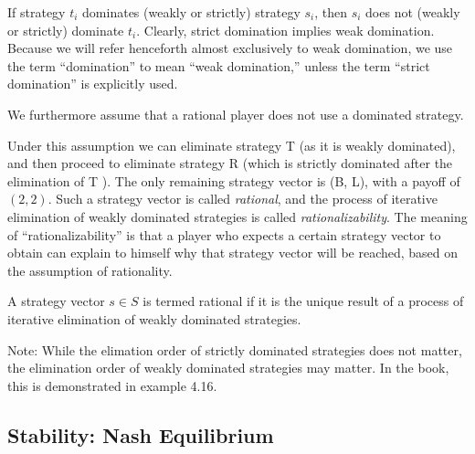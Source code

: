 If strategy $t_i$ dominates (weakly or strictly) strategy $s_i$, then $s_i$ does not (weakly or strictly) dominate $t_i$. Clearly, strict domination implies weak domination. Because we will refer henceforth almost exclusively to weak domination, we use the term “domination” to mean “weak domination,” unless the term “strict domination” is explicitly used.

We furthermore assume that a rational player does not use a dominated strategy.

Under this assumption we can eliminate strategy T (as it is weakly dominated), and then proceed to eliminate strategy R (which
is strictly dominated after the elimination of T ). The only remaining strategy vector is (B, L), with a payoff of $(2, 2)$. Such a strategy vector is called \emph{rational}, and the process of iterative elimination of weakly dominated strategies is called \emph{rationalizability}. The meaning of “rationalizability” is that a player who expects a certain strategy vector to obtain can explain to himself why that strategy vector will be reached, based on the assumption of rationality.

\begin{definition}
A strategy vector $s \in S$ is termed rational if it is the unique result of a process of iterative elimination of weakly dominated strategies.
\end{definition}

Note: While the elimation order of strictly dominated strategies does not matter, the elimination order of weakly dominated strategies may matter. In the book, this is demonstrated in example 4.16.

\subsection{Stability: Nash Equilibrium}




